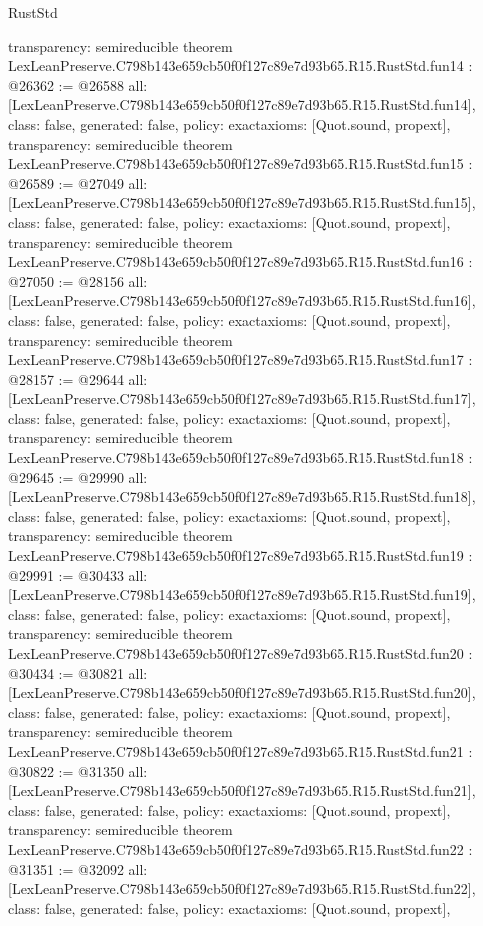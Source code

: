 \begin{lexlean}{RustStd}
\begin{coremodule}
{  transparency: semireducible
}
theorem LexLeanPreserve.C798b143e659cb50f0f127c89e7d93b65.R15.RustStd.fun14 : @26362 := @26588 {
  all: [LexLeanPreserve.C798b143e659cb50f0f127c89e7d93b65.R15.RustStd.fun14],
  class: false,
  generated: false,
  policy: exact{axioms: [Quot.sound, propext]},
  transparency: semireducible
}
theorem LexLeanPreserve.C798b143e659cb50f0f127c89e7d93b65.R15.RustStd.fun15 : @26589 := @27049 {
  all: [LexLeanPreserve.C798b143e659cb50f0f127c89e7d93b65.R15.RustStd.fun15],
  class: false,
  generated: false,
  policy: exact{axioms: [Quot.sound, propext]},
  transparency: semireducible
}
theorem LexLeanPreserve.C798b143e659cb50f0f127c89e7d93b65.R15.RustStd.fun16 : @27050 := @28156 {
  all: [LexLeanPreserve.C798b143e659cb50f0f127c89e7d93b65.R15.RustStd.fun16],
  class: false,
  generated: false,
  policy: exact{axioms: [Quot.sound, propext]},
  transparency: semireducible
}
theorem LexLeanPreserve.C798b143e659cb50f0f127c89e7d93b65.R15.RustStd.fun17 : @28157 := @29644 {
  all: [LexLeanPreserve.C798b143e659cb50f0f127c89e7d93b65.R15.RustStd.fun17],
  class: false,
  generated: false,
  policy: exact{axioms: [Quot.sound, propext]},
  transparency: semireducible
}
theorem LexLeanPreserve.C798b143e659cb50f0f127c89e7d93b65.R15.RustStd.fun18 : @29645 := @29990 {
  all: [LexLeanPreserve.C798b143e659cb50f0f127c89e7d93b65.R15.RustStd.fun18],
  class: false,
  generated: false,
  policy: exact{axioms: [Quot.sound, propext]},
  transparency: semireducible
}
theorem LexLeanPreserve.C798b143e659cb50f0f127c89e7d93b65.R15.RustStd.fun19 : @29991 := @30433 {
  all: [LexLeanPreserve.C798b143e659cb50f0f127c89e7d93b65.R15.RustStd.fun19],
  class: false,
  generated: false,
  policy: exact{axioms: [Quot.sound, propext]},
  transparency: semireducible
}
theorem LexLeanPreserve.C798b143e659cb50f0f127c89e7d93b65.R15.RustStd.fun20 : @30434 := @30821 {
  all: [LexLeanPreserve.C798b143e659cb50f0f127c89e7d93b65.R15.RustStd.fun20],
  class: false,
  generated: false,
  policy: exact{axioms: [Quot.sound, propext]},
  transparency: semireducible
}
theorem LexLeanPreserve.C798b143e659cb50f0f127c89e7d93b65.R15.RustStd.fun21 : @30822 := @31350 {
  all: [LexLeanPreserve.C798b143e659cb50f0f127c89e7d93b65.R15.RustStd.fun21],
  class: false,
  generated: false,
  policy: exact{axioms: [Quot.sound, propext]},
  transparency: semireducible
}
theorem LexLeanPreserve.C798b143e659cb50f0f127c89e7d93b65.R15.RustStd.fun22 : @31351 := @32092 {
  all: [LexLeanPreserve.C798b143e659cb50f0f127c89e7d93b65.R15.RustStd.fun22],
  class: false,
  generated: false,
  policy: exact{axioms: [Quot.sound, propext]},
}
\end{coremodule}
\end{lexlean}
